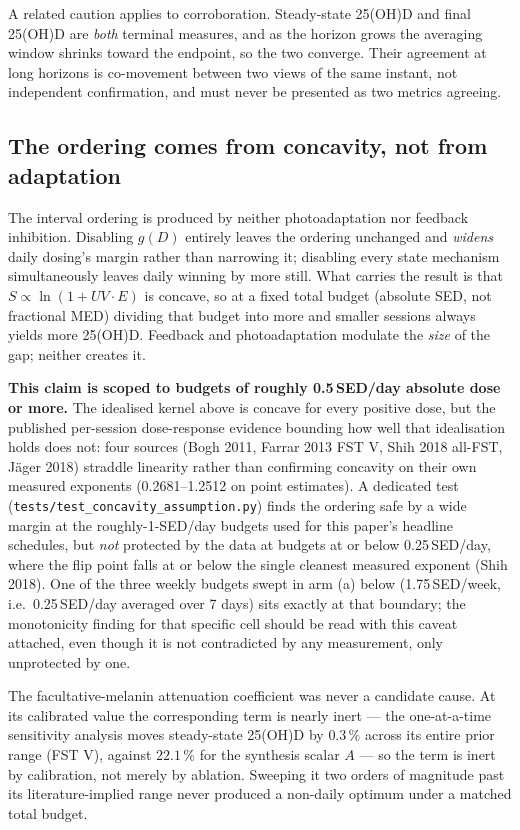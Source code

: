 \documentclass[11pt]{article}
\begin{document}
A related caution applies to corroboration. Steady-state 25(OH)D and
final 25(OH)D are \emph{both} terminal measures, and as the horizon
grows the averaging window shrinks toward the endpoint, so the two
converge. Their agreement at long horizons is co-movement between two
views of the same instant, not independent confirmation, and must
never be presented as two metrics agreeing.

\subsection{The ordering comes from concavity, not from adaptation}
\label{sec:mechanism}

The interval ordering is produced by neither photoadaptation nor
feedback inhibition. Disabling $g(D)$ entirely leaves the ordering
unchanged and \emph{widens} daily dosing's margin rather than
narrowing it; disabling every state mechanism simultaneously leaves
daily winning by more still. What carries the result is that
$S \propto \ln(1 + UV \cdot E)$ is concave, so at a fixed total budget
(absolute SED, not fractional MED) dividing that budget into more and
smaller sessions always yields more 25(OH)D. Feedback and
photoadaptation modulate the \emph{size} of the gap; neither creates
it.

\textbf{This claim is scoped to budgets of roughly 0.5\,SED/day
absolute dose or more.} The idealised kernel above is concave for
every positive dose, but the published per-session dose-response
evidence bounding how well that idealisation holds does not: four
sources (Bogh 2011, Farrar 2013 FST V, Shih 2018 all-FST, J\"ager
2018) straddle linearity rather than confirming concavity on their own
measured exponents (0.2681--1.2512 on point estimates). A dedicated
test (\texttt{tests/test\_concavity\_assumption.py}) finds the
ordering safe by a wide margin at the roughly-1-SED/day budgets used
for this paper's headline schedules, but \emph{not} protected by the
data at budgets at or below 0.25\,SED/day, where the flip point falls
at or below the single cleanest measured exponent (Shih 2018). One of
the three weekly budgets swept in arm (a) below (1.75\,SED/week,
i.e.\ 0.25\,SED/day averaged over 7 days) sits exactly at that
boundary; the monotonicity finding for that specific cell should be
read with this caveat attached, even though it is not contradicted by
any measurement, only unprotected by one.

The facultative-melanin attenuation coefficient was never a candidate
cause. At its calibrated value the corresponding term is nearly inert
--- the one-at-a-time sensitivity analysis moves steady-state 25(OH)D
by $0.3\,\%$ across its entire prior range (FST V), against
$22.1\,\%$ for the synthesis scalar $A$ --- so the term is inert by
calibration, not merely by ablation. Sweeping it two orders of magnitude past its
literature-implied range never produced a non-daily optimum under a
matched total budget.
\end{document}
